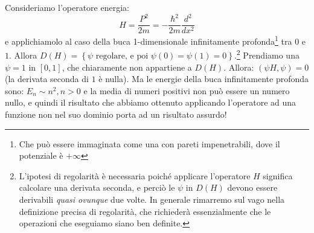 \documentclass[FisicaTeorica.tex]{subfiles}
\begin{document}
	\begin{es}
	Consideriamo l'operatore energia: 
	\[H=\frac{P^2}{2m}=-\frac{\hbar^2}{2m}\frac{d^2}{dx^2}\]
	e applichiamolo al caso della buca 1-dimensionale infinitamente profonda\footnote{Che può essere immaginata come una  con pareti impenetrabili, dove il potenziale è $+\infty$} tra $0$ e $1$.
	Allora $D\left(H\right)=\left\{\psi\text{\ regolare,\ e\ poi\ } \psi\left(0\right)=\psi\left(1\right)=0\right\}$.\footnote{L'ipotesi di regolarità è necessaria poiché applicare l'operatore $H$ significa calcolare una derivata seconda, e perciò le $\psi$ in $D(H)$ devono essere derivabili \textit{quasi ovunque} due volte. In generale rimarremo sul vago nella definizione precisa di regolarità, che richiederà essenzialmente che le operazioni che eseguiamo siano ben definite.}
	Prendiamo una $\psi=1$ in $[0,1]$, che chiaramente non appartiene a $D(H)$. 
	Allora:
	$\left(\psi H,\psi\right)=0$ (la derivata seconda di $1$ è nulla).
	Ma le energie della buca infinitamente profonda sono: $E_n\sim n^2, n>0$ e la media di numeri positivi non può essere un numero nullo, e quindi il risultato che abbiamo ottenuto applicando l'operatore ad una funzione non nel suo dominio porta ad un risultato assurdo!
	\end{es}
\end{document}

